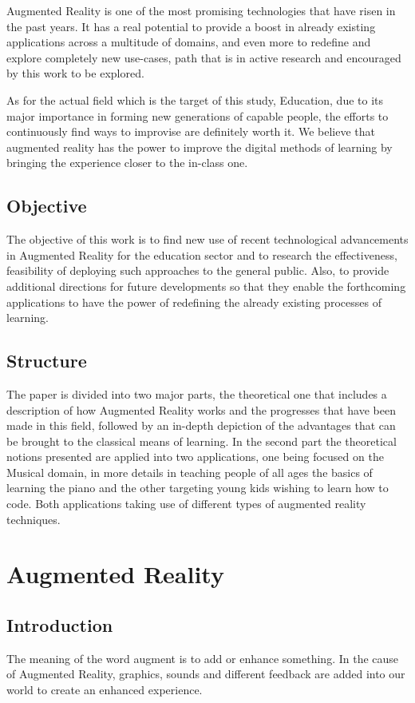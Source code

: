 \documentclass[12 pct]{report}
\begin{document}
Augmented Reality is one of the most promising technologies that have risen in the past years. It has a real potential to provide a boost in already existing applications across a multitude of domains, and even more to redefine and explore completely new use-cases, path that is in active research and encouraged
 by this work to be explored.

As for the actual field which is the target of this study, Education, due to its major importance in forming new generations of capable people, the efforts to continuously find ways to improvise are definitely worth it. We believe that augmented reality has the power to improve the digital methods of learning by  bringing the experience closer  to the in-class one.
\section{Objective}
The objective of this work is to find new use of recent technological advancements in Augmented Reality for the education sector and to research the effectiveness, feasibility of deploying such approaches to the general public. Also, to provide additional directions for future developments so that they enable the  forthcoming applications to have the power of redefining the already existing processes of learning.

\section{Structure}
The paper is divided into two major parts, the theoretical one that includes a description of how Augmented Reality works and the progresses that have been made in this field, followed by an in-depth depiction of the advantages that can be brought to the classical means of learning. In the second part the theoretical notions presented are applied into two applications, one being focused on the Musical domain, in more details in teaching people of all ages the basics of learning the piano and the other targeting young kids wishing to learn how to code. Both applications taking use of different types of augmented reality techniques.
\chapter{Augmented Reality}

\section{Introduction}
The meaning of the word augment is to add or enhance something. In the cause of Augmented Reality, graphics, sounds and different feedback are added into our world to create an enhanced experience.
\end{document}
